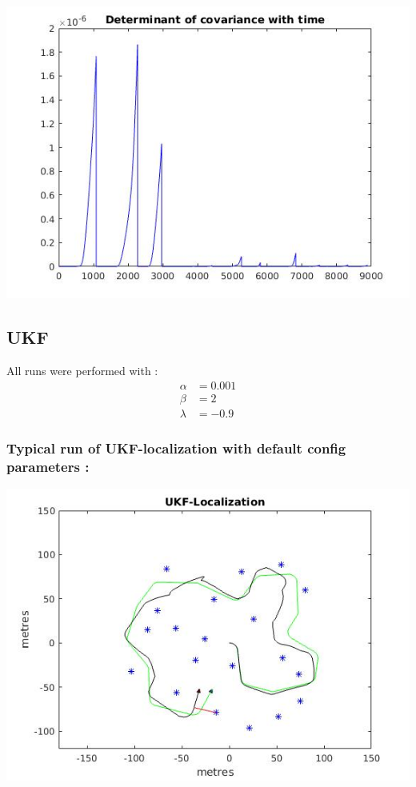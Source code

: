 \documentclass[a4paper,fleqn,11pt]{article}
\theoremstyle{mytheor}
\begin{document}
\begin{center}
\includegraphics[scale = 0.37]{../images/EKF-perfect-measurement-cvt.jpg}
\end{center}

\subsection{UKF}

All runs were performed with :
\begin{align*}
	\alpha & = 0.001 \\
	\beta  & = 2 \\
	\lambda & = -0.9
\end{align*}

\subsubsection{Typical run of UKF-localization with default config parameters :}

\begin{center}
\includegraphics[scale = 0.74]{../images/UKF-default1.jpg} \\
\end{center}
\end{document}
